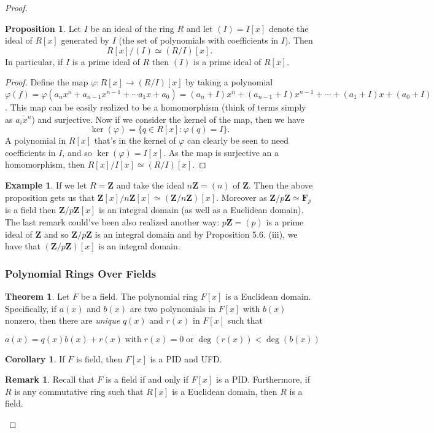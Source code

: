 \documentclass[9pt,reqno]{amsart}
\theoremstyle{definition}
\newtheorem{theorem}{Theorem}[section]
\newtheorem{rem}{Remark}[section]
\newtheorem{prop}{Proposition}[section]
\newtheorem{coro}{Corollary}[section]
\newtheorem{ex}{Example}[section]
\newcommand{\zz}{\mathbf Z}
\begin{document}
\begin{proof}
\begin{prop}
Let $I$ be an ideal of the ring $R$ and let $(I) = I[x]$ denote the ideal of $R[x]$ generated by $I$ (the set of polynomials with coefficients in $I$). Then $$R[x] / (I) \simeq (R/I) [x].$$
In particular, if $I$ is a prime ideal of $R$ then $(I)$ is a prime ideal of $R[x]$. 
\end{prop}
\begin{proof}
	Define the map $\varphi \colon R[x] \to (R/I) [x]$ by taking a polynomial $ \varphi (f) = \varphi (a_n x^n + a_{n-1}x^{n-1} + \cdots a_1 x +a_0) = (a_n + I)x^n + (a_{n-1} + I)x^{n-1} + \cdots + (a_1 + I)x + (a_0 + I)$. This map can be easily realized to be a homomorphism (think of terms simply as $\overline{a_i x^n}$) and surjective. Now if we consider the kernel of the map, then we have $$ \ker (\varphi) = \{ q \in R[x] \colon \varphi (q) = I \}. $$ A polynomial in $R[x]$ that's in the kernel of $\varphi$ can clearly be seen to need coefficients in $I$, and so $\ker (\varphi) = I[x]$. As the map is surjective an a homomorphism, then $R[x]/I[x] \simeq (R/I)[x]$. 
\end{proof}
\begin{ex}
	If we let $R = \zz$ and take the ideal $n\zz = (n)$ of $\zz$. Then the above proposition gets us that $\zz [x] / n\zz [x]  \simeq (\zz / n \zz) [x]$.  Moreover as $\zz / p \zz \simeq \mathbf{F}_p$ is a field then $\zz/ p \zz [x]$ is an integral domain (as well as a Euclidean domain). The last remark could've been also realized another way: $p \zz = (p)$ is a prime ideal of $\zz$ and so $\zz / p \zz$ is an integral domain and by Proposition 5.6. (iii), we have that $(\zz / p \zz) [x]$ is an integral domain. 
\end{ex}
\subsubsection{Polynomial Rings Over Fields} 

\begin{theorem}
	Let $F$ be a field. The polynomial ring $F[x]$ is a Euclidean domain. Specifically, if $a(x)$ and $b(x)$ are two polynomials in $F[x]$ with $b(x)$ nonzero, then there are \textit{unique} $q(x)$ and $r(x)$ in $F[x]$ such that 
	
$$a(x) = q(x) b(x) + r(x) \; \text{with} \; r(x) = 0 \; \text{or} \; \deg(r(x)) < \deg (b(x))$$
\end{theorem}

\begin{coro}
If $F$ is field, then $F[x]$ is a PID and UFD. 	
\end{coro}
\begin{rem}
Recall that $F$ is a field if and only if $F[x]$ is a PID. Furthermore, if $R$ is any commutative ring such that $R[x]$ is a Euclidean domain, then $R$ is a field. 
\end{rem}


\end{proof}
\end{document}
